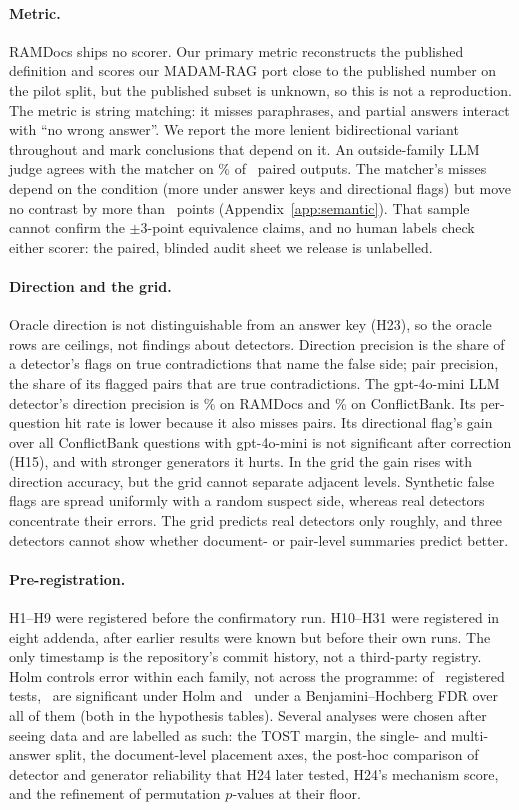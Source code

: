 \paragraph{Metric.} RAMDocs ships no scorer. Our primary metric reconstructs the published definition and scores our
MADAM-RAG port close to the published number on the pilot split, but the published subset is unknown, so this
is not a reproduction. The metric is string matching: it misses paraphrases, and partial answers interact with ``no wrong
answer''. We report the more lenient bidirectional variant throughout and mark conclusions that depend on
it. An outside-family LLM judge agrees with the matcher on \semAgree\% of \semN\ paired outputs. The matcher's
misses depend on the condition (more under answer keys and directional flags) but move no contrast by more than
\semDidMax\ points (Appendix~\ref{app:semantic}). That sample cannot confirm the $\pm$3-point equivalence claims, and
no human labels check either scorer: the paired, blinded audit sheet we release is unlabelled.

\paragraph{Direction and the grid.} Oracle direction is not distinguishable from an answer key (H23), so the
oracle rows are ceilings, not findings about detectors. Direction precision is the share of a detector's flags on true
contradictions that name the false side; pair precision, the share of its flagged pairs that are
true contradictions. The gpt-4o-mini LLM detector's direction precision is
\dirAccLlm\% on RAMDocs and \cbDirAccLlm\% on ConflictBank. Its per-question hit rate is lower because it also misses pairs. Its directional flag's gain over
all ConflictBank questions with gpt-4o-mini is not significant after correction (H15), and with stronger generators it
hurts. In the grid the gain rises with direction accuracy, but the grid cannot separate adjacent levels.
Synthetic false flags are spread uniformly with a random suspect side, whereas real detectors concentrate their
errors. The grid predicts real detectors only roughly, and three detectors cannot show whether document- or pair-level
summaries predict better.

\paragraph{Pre-registration.} H1--H9 were registered before the confirmatory run. H10--H31
were registered in eight addenda, after earlier results were known but before their own runs. The only
timestamp is the repository's commit history, not a third-party registry. Holm controls error within each family, not
across the programme: of \fdrN\ registered tests, \fdrHolm\ are significant under Holm and \fdrBH\ under a
Benjamini--Hochberg FDR over all of them (both in the hypothesis tables). Several analyses were chosen after
seeing data and are labelled as such: the TOST margin, the single- and multi-answer split, the document-level
placement axes, the post-hoc comparison of detector and generator reliability that H24 later tested, H24's mechanism
score, and the refinement of permutation $p$-values at their floor.

